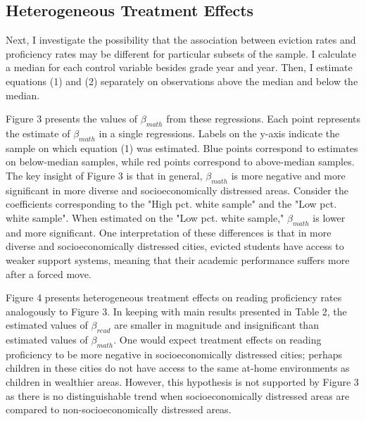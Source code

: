 \documentclass[12pt]{article}
\begin{document}
\subsection{Heterogeneous Treatment Effects}
Next, I investigate the possibility that the association between eviction rates and proficiency rates may be different for particular subsets of the sample. I calculate a median for each control variable besides grade year and year. Then, I estimate equations (1) and (2) separately on observations above the median and below the median. 

Figure 3 presents the values of $\beta_{math}$ from these regressions. Each point represents the estimate of $\beta_{math}$ in a single regressions. Labels on the y-axis indicate the sample on which equation (1) was estimated. Blue points correspond to estimates on below-median samples, while red points correspond to above-median samples. The key insight of Figure 3 is that in general, $\beta_{math}$ is more negative and more significant in more diverse and socioeconomically distressed areas. Consider the coefficients corresponding to the "High pct. white sample" and the "Low pct. white sample". When estimated on the "Low pct. white sample," $\beta_{math}$ is lower and more significant. One interpretation of these differences is that in more diverse and socioeconomically distressed cities, evicted students have access to weaker support systems, meaning that their academic performance suffers more after a forced move. 

Figure 4 presents heterogeneous treatment effects on reading proficiency rates analogously to Figure 3. In keeping with main results presented in Table 2, the estimated values of $\beta_{read}$ are smaller in magnitude and insignificant than estimated values of $\beta_{math}$. One would expect treatment effects on reading proficiency to be more negative in socioeconomically distressed cities; perhaps children in these cities do not have access to the same at-home environments as children in wealthier areas. However, this hypothesis is not supported by Figure 3 as there is no distinguishable trend when socioeconomically distressed areas are compared to non-socioeconomically distressed areas.
\end{document}

